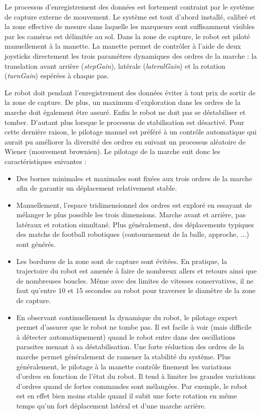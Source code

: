 Le processus d'enregistrement des données est fortement contraint 
par le système de capture externe de mouvement.
Le système est tout d'abord installé, calibré et la zone effective
de mesure dans laquelle les marqueurs sont suffisamment visibles par 
les caméras est délimitée au sol.
Dans la zone de capture, le robot est piloté manuellement à la 
manette. La manette permet de contrôler à l'aide de deux joysticks
directement les trois paramètres dynamiques des ordres de la marche :
la translation avant arrière (\textit{stepGain}), latérale (\textit{lateralGain}) 
et la rotation (\textit{turnGain}) espérées à chaque pas.

Le robot doit pendant l'enregistrement des données éviter à tout prix
de sortir de la zone de capture. De plus, un maximum d'exploration dans
les ordres de la marche doit également être assuré. 
Enfin le robot ne doit pas se déstabiliser et tomber. 
D'autant plus lorsque le processus de stabilisation est désactivé.
Pour cette dernière raison, le pilotage manuel est préféré à un contrôle automatique
qui aurait pu améliorer la diversité des ordres en suivant un processus aléatoire
de Wiener (mouvement brownien).
Le pilotage de la marche suit donc les caractéristiques suivantes :
\begin{itemize}
    \item Des bornes minimales et maximales sont fixées aux trois 
        ordres de la marche afin de garantir un déplacement relativement stable.
    \item Manuellement, l'espace tridimensionnel des ordres est exploré en essayant
        de mélanger le plus possible les trois dimensions. Marche avant et arrière,
        pas latéraux et rotation simultané. 
        Plus généralement, des déplacements typiques des matchs de football robotiques
        (contournement de la balle, approche, ...) sont générés.
    \item Les bordures de la zone sont de capture sont évitées. 
        En pratique, la trajectoire du robot est amenée à faire de nombreux allers et retours
        ainsi que de nombreuses boucles. Même avec des limites de vitesses conservatives, 
        il ne faut qu'entre $10$ et $15$ secondes au robot pour traverser le diamètre de 
        la zone de capture.
    \item En observant continuellement la dynamique du robot, le pilotage \og expert \fg
        permet d'assurer que le robot ne tombe pas. Il est facile à voir (mais difficile à
        détecter automatiquement) quand le robot entre dans des oscillations parasites menant
        à sa déstabilisation. Une forte réduction des ordres de la marche permet généralement 
        de ramener la stabilité du système.
        Plus généralement, le pilotage à la manette contrôle finement les variations d'ordres 
        en fonction de l'état du robot. Il tend à limiter les grandes variations 
        d'ordres quand de fortes commandes sont mélangées. Par exemple, le robot est en effet 
        bien moins stable quand il subit une forte rotation en même temps qu'un fort déplacement latéral 
        et d'une marche arrière.
\end{itemize}

